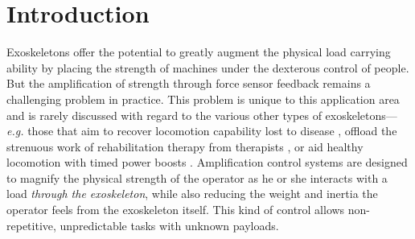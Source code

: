 \documentclass[utf8]{frontiersSCNS}
\renewcommand*{\cite}[1]{\citep{#1}}
\begin{document}
\section{Introduction}\label{sec:intro}
 
Exoskeletons offer the potential to greatly augment the physical load carrying ability by placing the strength of machines under the dexterous control of people. But the amplification of strength through force sensor feedback remains a challenging problem in practice.
This problem is unique to this application area and is rarely discussed with regard to the various other types of exoskeletons---\emph{e.g.} those that aim to recover locomotion capability lost to disease \cite{KwaNoordenMisselCraigPrattNeuhaus2009ICRA,AgrawalHaribHereidFinetMasselinPralyAmesSreenathGrizzle2017Access}, offload the strenuous work of rehabilitation therapy from therapists \cite{SugarHeEA2007TNSRE,KimDeshpande2017IJRR}, or aid healthy locomotion with timed power boosts \cite{MooneyRouseHerr2014JNRE,ZhangFiersWitteJacksonPoggenseeAtkesonCollins2017Science,SawickiBeckKangYoung2020JNER}.
Amplification control systems are designed to magnify the physical strength of the operator as he or she interacts with a load \emph{through the exoskeleton}, while also reducing the weight and inertia the operator feels from the exoskeleton itself. This kind of control allows non-repetitive, unpredictable tasks with unknown payloads.
\end{document}
